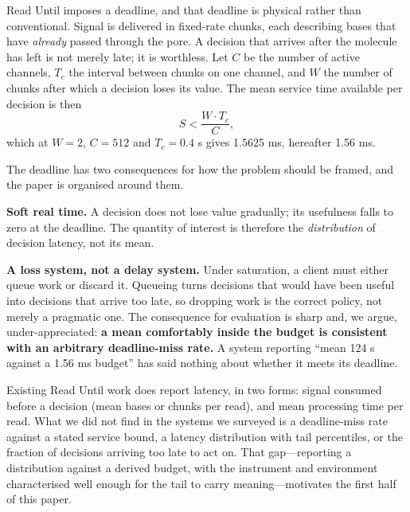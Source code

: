 \documentclass[conference]{IEEEtran}
\begin{document}
Read Until imposes a deadline, and that deadline is physical rather than conventional. Signal
is delivered in fixed-rate chunks, each describing bases that have \emph{already} passed
through the pore. A decision that arrives after the molecule has left is not merely late; it is
worthless. Let $C$ be the number of active channels, $T_c$ the interval between chunks on one
channel, and $W$ the number of chunks after which a decision loses its value. The mean service
time available per decision is then
\begin{equation}
S < \frac{W \cdot T_c}{C},
\label{eq:budget}
\end{equation}
which at $W = 2$, $C = 512$ and $T_c = 0.4$ s gives 1.5625 ms, hereafter 1.56 ms.

The deadline has two consequences for how the problem should be framed, and the paper is
organised around them.

\textbf{Soft real time.} A decision does not lose value gradually; its usefulness falls to zero
at the deadline. The quantity of interest is therefore the \emph{distribution} of decision
latency, not its mean.

\textbf{A loss system, not a delay system.} Under saturation, a client must either queue work or
discard it. Queueing turns decisions that would have been useful into decisions that arrive too
late, so dropping work is the correct policy, not merely a pragmatic one. The
consequence for evaluation is sharp and, we argue, under-appreciated: \textbf{a mean
comfortably inside the budget is consistent with an arbitrary deadline-miss rate.} A system
reporting ``mean 124 \textmu{}s against a 1.56 ms budget'' has said nothing about whether it meets its
deadline.

Existing Read Until work does report latency, in two forms: signal consumed before a decision
(mean bases or chunks per read), and mean processing time per read. What we did not find in the
systems we surveyed is a deadline-miss rate against a stated service bound, a latency
distribution with tail percentiles, or the fraction of decisions arriving too late to act on.
That gap---reporting a distribution against a derived budget, with the instrument and
environment characterised well enough for the tail to carry meaning---motivates the first half
of this paper.
\end{document}
